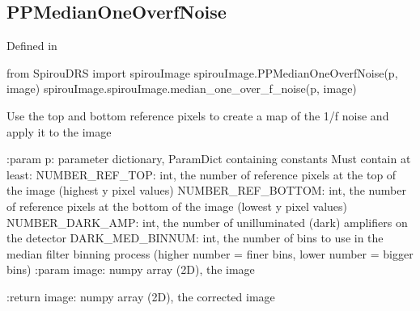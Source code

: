 \noindent\begin{minipage}{\textwidth}
\subsection{PPMedianOneOverfNoise}

Defined in \spirouImage{}

\begin{pythonbox}
from SpirouDRS import spirouImage
spirouImage.PPMedianOneOverfNoise(p, image)
spirouImage.spirouImage.median_one_over_f_noise(p, image)
\end{pythonbox}

\begin{pythondocstring}
Use the top and bottom reference pixels to create a map of the 1/f noise
and apply it to the image

:param p: parameter dictionary, ParamDict containing constants
        Must contain at least:
            NUMBER_REF_TOP: int, the number of reference pixels at the top
                            of the image (highest y pixel values)
            NUMBER_REF_BOTTOM: int, the number of reference pixels at the
                               bottom of the image (lowest y pixel values)
            NUMBER_DARK_AMP: int, the number of unilluminated (dark)
                             amplifiers on the detector
            DARK_MED_BINNUM: int, the number of bins to use in the median
                             filter binning process (higher number = finer
                             bins, lower number = bigger bins)
:param image: numpy array (2D), the image

:return image: numpy array (2D), the corrected image
\end{pythondocstring}
\end{minipage}



